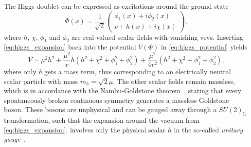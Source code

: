 The Higgs doublet can be expressed as excitations around the ground state
\begin{equation}
	\Phi(x) = \frac{1}{\sqrt{2}} \begin{pmatrix}
		\phi_1(x)+i\phi_2(x) \\
		v + h(x) + i\chi(x)
	\end{pmatrix},
	\label{eq:higgs_expansion}
\end{equation}
where $h$, $\chi$, $\phi_1$ and $\phi_2$ are real-valued scalar fields with vanishing \glspl{vev}. Inserting 
\cref{eq:higgs_expansion} back into the potential $V(\Phi)$ in \cref{eq:higgs_potential} yields
\begin{equation}
	V = \mu^2h^2 + \frac{\mu^2}{v} h (h^2 + \chi^2 + \phi_1^2+\phi_2^2)+ \frac{\mu^2}{4v^2}(h^2 + \chi^2 + \phi_1^2 + \phi_2^2),
	\label{eq:higgs_potential_excitation}
\end{equation}
where only \textit{h} gets a mass term, thus corresponding to an electrically neutral scalar particle with mass $m_h = \sqrt{2}\mu$.
The other scalar fields remain massless, which is in accordance with the Nambu-Goldstone theorem~\cite{Nambu:1960tm,Goldstone:1961eq}, stating that every spontaneously broken continuous symmetry generates a massless Goldstone boson. These bosons are unphysical and can be gauged away through a $SU(2)_\mathrm{L}$ transformation, such that the expansion around the vacuum from \cref{eq:higgs_expansion}, involves only the physical scalar $h$ in the so-called \textit{unitary gauge}~\cite{Brock:1354959}.
